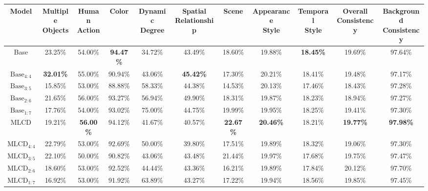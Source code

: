 \begin{table*}[ht]
\vspace{+5mm}
\begin{tabular}{ccccccccccc}
\toprule 
\textbf{Model} & \makecell{\textbf{Multiple} \\ \textbf{Objects}} &  \makecell{\textbf{Human} \\ \textbf{Action}} & \textbf{Color} & \makecell{\textbf{Dynamic} \\ \textbf{Degree}} & \makecell{\textbf{Spatial} \\ \textbf{Relationship}} & \textbf{Scene} & \makecell{\textbf{Appearance} \\ \textbf{Style}} & \makecell{\textbf{Temporal} \\ \textbf{Style}} & \makecell{\textbf{Overall} \\ \textbf{Consistency}} & \makecell{\textbf{Background} \\ \textbf{Consistency}} \\
\midrule
Base & 23.25\% & 54.00\% & \textbf{94.47\%} & 34.72\% & 43.49\% & 18.60\% & 19.88\% & \textbf{18.45\%} & 19.69\% & 97.64\% \\ 
$\text{Base}_{4:4}$ & \textbf{32.01\%} & 55.00\% & 90.94\% & 43.06\% & \textbf{45.42\%} & 17.30\% & 20.21\% & 18.41\% & 19.48\% & 97.17\% \\ 
$\text{Base}_{3:5}$ & 15.85\% & 53.00\% & 88.88\% & 58.33\% & 44.38\% & 14.53\% & 20.13\% & 17.46\% & 18.43\% & 97.28\%  \\ 
$\text{Base}_{2:6}$ & 21.65\% & 56.00\% & 93.27\% & 56.94\% & 49.90\% & 18.31\% & 19.87\% & 18.23\% & 18.94\% & 97.27\% \\ 
$\text{Base}_{1:7}$& 17.76\% & 54.00\% & 93.02\% & 75.00\% & 44.75\% & 19.99\% & 19.95\% & 18.25\% & 19.41\% & 97.30\%  \\ 
\midrule
MLCD & 19.21\% & \textbf{56.00\%} & 94.12\% & 41.67\% & 40.57\% & \textbf{22.67\%} & \textbf{20.46\%} & 18.21\% & \textbf{19.77\%} & \textbf{97.98\%} \\ 
$\text{MLCD}_{4:4}$ & 22.79\% & 53.00\% & 92.69\% & 50.00\% & 39.80\% & 17.51\% & 19.89\% & 18.32\% & 19.06\% & 97.30\% \\ 
$\text{MLCD}_{3:5}$ & 22.10\% & 50.00\% & 90.82\% & 43.06\% & 43.48\% & 21.44\% & 19.97\% & 17.68\% & 19.75\% & 97.47\% \\ 
$\text{MLCD}_{2:6}$ & 18.60\% & 53.00\% & 92.52\% & 44.44\% & 43.36\% & 16.21\% & 19.89\% & 17.84\% & 20.12\% & 97.70\%  \\ 
$\text{MLCD}_{1:7}$ & 16.92\% & 53.00\% & 91.92\% & 63.89\% & 43.27\% & 17.22\% & 19.94\% & 18.56\% & 19.85\% & 97.45\% \\ 
\bottomrule
\end{tabular}
\end{table*}

